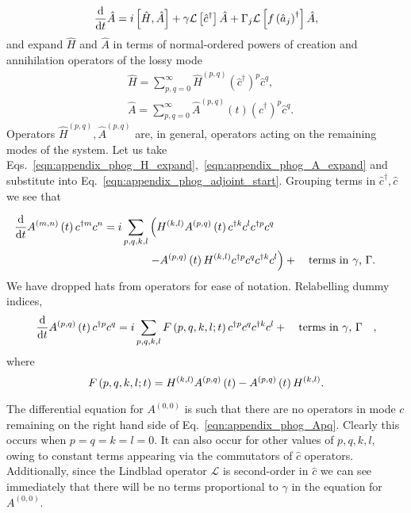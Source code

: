 \begin{equation}\label{eqn:appendix_phog_adjoint_start}
\frac{\mathrm{d}}{\mathrm{d}t} \hat{A} = i \left[ \hat{H}, \hat{A} \right] + \gamma \mathcal{L}\left[\hat{c}^\dagger \right] \hat{A} + \Gamma_j \mathcal{L} \left[ f\left(\hat{a}_j\right)^\dagger\right] \hat{A},
\end{equation}
and expand $\hat{H}$ and $\hat{A}$ in terms of normal-ordered powers of creation and annihilation operators of the lossy mode
\begin{align}
&\hat{H} = \sum_{p, q = 0}^{\infty} \hat{H}^{\left(p, q\right)} \left(\hat{c}^\dagger\right)^p \hat{c}^q, \label{eqn:appendix_phog_H_expand}  \\
%
&\hat{A} = \sum_{p, q = 0}^{\infty} \hat{A}^{\left(p, q\right)}\left(t\right) \left(\hat{c}^\dagger \right)^p \hat{c}^q . \label{eqn:appendix_phog_A_expand}
\end{align}
Operators $\hat{H}^{\left(p, q\right)}, \hat{A}^{\left(p, q\right)}$ are, in general, operators acting on the remaining modes of the system. Let us take Eqs.~\ref{eqn:appendix_phog_H_expand},~\ref{eqn:appendix_phog_A_expand} and substitute into Eq.~\ref{eqn:appendix_phog_adjoint_start}. Grouping terms in $\hat{c}^\dagger, \hat{c}$ we see that 

\begin{align}
\ddt A^{\left(m, n\right)}\left(t\right) c^{\dagger m} c^n = i \sum_{p, q, k, l} &\left(H^{\left(k, l\right)} A^{\left(p, q\right)}\left(t\right) c^{\dagger k} c^{l} c^{\dagger p} c^q \right. \notag \\
&\left.- A^{\left(p, q\right)}\left(t\right) H^{\left(k, l\right)} c^{\dagger p} c^q c^{\dagger k} c^l\right)
%
+ \qq{terms in $\gamma$, $\Gamma$.}&
\end{align}
We have dropped hats from operators for ease of notation. Relabelling dummy indices,
\begin{equation}\label{eqn:appendix_phog_Apq}
\ddt A^{\left(p, q\right)}\left(t\right) c^{\dagger p} c^q = i \sum_{p, q, k, l} F\left(p, q, k, l; t\right) c^{\dagger p} c^{q} c^{\dagger k} c^l + \qq{terms in $\gamma$, $\Gamma$},
\end{equation}
where
\begin{equation}
F\left(p, q, k, l; t\right) = H^{\left(k, l\right)} A^{\left(p, q\right)}\left(t\right) - A^{\left(p, q\right)}\left(t\right) H^{\left(k, l\right)}. \notag
\end{equation}

\noindent The differential equation for $A^{\left(0, 0\right)}$ is such that there are no operators in mode $c$ remaining on the right hand side of Eq.~\ref{eqn:appendix_phog_Apq}. Clearly this occurs when $p=q=k=l=0$. It can also occur for other values of $p, q, k, l$, owing to constant terms appearing via the commutators of $\hat{c}$ operators. Additionally, since the Lindblad operator $\mathcal{L}$ is second-order in $\hat{c}$ we can see immediately that there will be no terms proportional to $\gamma$ in the equation for $A^{\left(0, 0\right)}$. 

